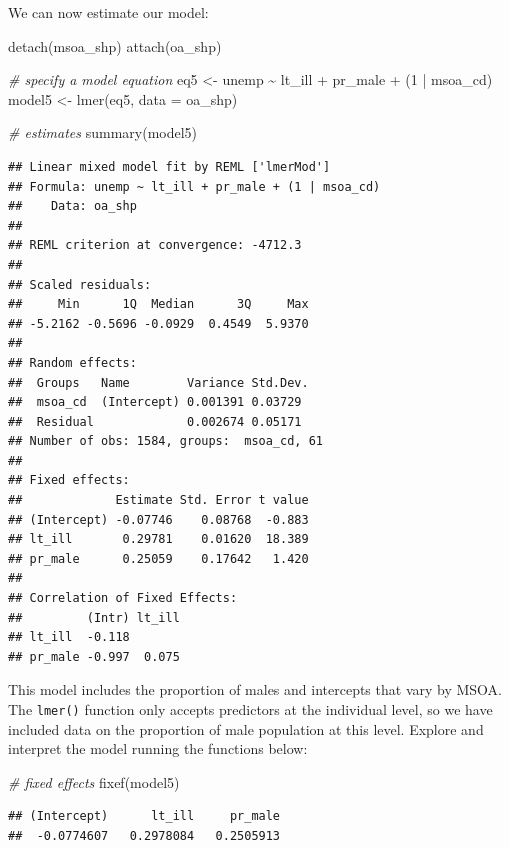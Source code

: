 \documentclass[
]{book}
\newenvironment{Shaded}{\begin{snugshade}}{\end{snugshade}}
\newcommand{\AttributeTok}[1]{\textcolor[rgb]{0.77,0.63,0.00}{#1}}
\newcommand{\CommentTok}[1]{\textcolor[rgb]{0.56,0.35,0.01}{\textit{#1}}}
\newcommand{\DecValTok}[1]{\textcolor[rgb]{0.00,0.00,0.81}{#1}}
\newcommand{\FunctionTok}[1]{\textcolor[rgb]{0.00,0.00,0.00}{#1}}
\newcommand{\NormalTok}[1]{#1}
\newcommand{\OtherTok}[1]{\textcolor[rgb]{0.56,0.35,0.01}{#1}}
\newcommand{\SpecialCharTok}[1]{\textcolor[rgb]{0.00,0.00,0.00}{#1}}
\begin{document}
We can now estimate our model:

\begin{Shaded}
\begin{Highlighting}[]
\FunctionTok{detach}\NormalTok{(msoa\_shp)}
\FunctionTok{attach}\NormalTok{(oa\_shp)}

\CommentTok{\# specify a model equation}
\NormalTok{eq5 }\OtherTok{\textless{}{-}}\NormalTok{ unemp }\SpecialCharTok{\textasciitilde{}}\NormalTok{ lt\_ill }\SpecialCharTok{+}\NormalTok{ pr\_male }\SpecialCharTok{+}\NormalTok{ (}\DecValTok{1} \SpecialCharTok{|}\NormalTok{ msoa\_cd)}
\NormalTok{model5 }\OtherTok{\textless{}{-}} \FunctionTok{lmer}\NormalTok{(eq5, }\AttributeTok{data =}\NormalTok{ oa\_shp)}

\CommentTok{\# estimates}
\FunctionTok{summary}\NormalTok{(model5)}
\end{Highlighting}
\end{Shaded}

\begin{verbatim}
## Linear mixed model fit by REML ['lmerMod']
## Formula: unemp ~ lt_ill + pr_male + (1 | msoa_cd)
##    Data: oa_shp
## 
## REML criterion at convergence: -4712.3
## 
## Scaled residuals: 
##     Min      1Q  Median      3Q     Max 
## -5.2162 -0.5696 -0.0929  0.4549  5.9370 
## 
## Random effects:
##  Groups   Name        Variance Std.Dev.
##  msoa_cd  (Intercept) 0.001391 0.03729 
##  Residual             0.002674 0.05171 
## Number of obs: 1584, groups:  msoa_cd, 61
## 
## Fixed effects:
##             Estimate Std. Error t value
## (Intercept) -0.07746    0.08768  -0.883
## lt_ill       0.29781    0.01620  18.389
## pr_male      0.25059    0.17642   1.420
## 
## Correlation of Fixed Effects:
##         (Intr) lt_ill
## lt_ill  -0.118       
## pr_male -0.997  0.075
\end{verbatim}

This model includes the proportion of males and intercepts that vary by MSOA. The \texttt{lmer()}
function only accepts predictors at the individual level, so we have included data on the proportion of male population at this level. Explore and interpret the model running the functions below:

\begin{Shaded}
\begin{Highlighting}[]
\CommentTok{\# fixed effects}
\FunctionTok{fixef}\NormalTok{(model5)}
\end{Highlighting}
\end{Shaded}

\begin{verbatim}
## (Intercept)      lt_ill     pr_male 
##  -0.0774607   0.2978084   0.2505913
\end{verbatim}
\end{document}
